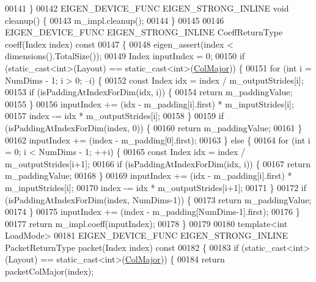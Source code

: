 \begin{DoxyCode}
00141   \}
00142   EIGEN\_DEVICE\_FUNC EIGEN\_STRONG\_INLINE \textcolor{keywordtype}{void} cleanup() \{
00143     m\_impl.cleanup();
00144   \}
00145 
00146   EIGEN\_DEVICE\_FUNC EIGEN\_STRONG\_INLINE CoeffReturnType coeff(Index index)\textcolor{keyword}{ const}
00147 \textcolor{keyword}{  }\{
00148     eigen\_assert(index < dimensions().TotalSize());
00149     Index inputIndex = 0;
00150     \textcolor{keywordflow}{if} (static\_cast<int>(Layout) == static\_cast<int>(\hyperlink{group__enums_ggaacded1a18ae58b0f554751f6cdf9eb13a0cbd4bdd0abcfc0224c5fcb5e4f6669a}{ColMajor})) \{
00151       \textcolor{keywordflow}{for} (\textcolor{keywordtype}{int} i = NumDims - 1; i > 0; --i) \{
00152         \textcolor{keyword}{const} Index idx = index / m\_outputStrides[i];
00153         \textcolor{keywordflow}{if} (isPaddingAtIndexForDim(idx, i)) \{
00154           \textcolor{keywordflow}{return} m\_paddingValue;
00155         \}
00156         inputIndex += (idx - m\_padding[i].first) * m\_inputStrides[i];
00157         index -= idx * m\_outputStrides[i];
00158       \}
00159       \textcolor{keywordflow}{if} (isPaddingAtIndexForDim(index, 0)) \{
00160         \textcolor{keywordflow}{return} m\_paddingValue;
00161       \}
00162       inputIndex += (index - m\_padding[0].first);
00163     \} \textcolor{keywordflow}{else} \{
00164       \textcolor{keywordflow}{for} (\textcolor{keywordtype}{int} i = 0; i < NumDims - 1; ++i) \{
00165         \textcolor{keyword}{const} Index idx = index / m\_outputStrides[i+1];
00166         \textcolor{keywordflow}{if} (isPaddingAtIndexForDim(idx, i)) \{
00167           \textcolor{keywordflow}{return} m\_paddingValue;
00168         \}
00169         inputIndex += (idx - m\_padding[i].first) * m\_inputStrides[i];
00170         index -= idx * m\_outputStrides[i+1];
00171       \}
00172       \textcolor{keywordflow}{if} (isPaddingAtIndexForDim(index, NumDims-1)) \{
00173         \textcolor{keywordflow}{return} m\_paddingValue;
00174       \}
00175       inputIndex += (index - m\_padding[NumDims-1].first);
00176     \}
00177     \textcolor{keywordflow}{return} m\_impl.coeff(inputIndex);
00178   \}
00179 
00180   \textcolor{keyword}{template}<\textcolor{keywordtype}{int} LoadMode>
00181   EIGEN\_DEVICE\_FUNC EIGEN\_STRONG\_INLINE PacketReturnType packet(Index index)\textcolor{keyword}{ const}
00182 \textcolor{keyword}{  }\{
00183     \textcolor{keywordflow}{if} (static\_cast<int>(Layout) == static\_cast<int>(\hyperlink{group__enums_ggaacded1a18ae58b0f554751f6cdf9eb13a0cbd4bdd0abcfc0224c5fcb5e4f6669a}{ColMajor})) \{
00184       \textcolor{keywordflow}{return} packetColMajor(index);

\end{DoxyCode}
